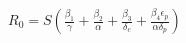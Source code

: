 \documentclass[preview]{standalone}
\begin{document}
\begin{center}
$R_0 = S (\frac{\beta_1}{\gamma} + \frac{\beta_2}{\alpha} + \frac{\beta_3}{\delta_c} + \frac{\beta_4 \epsilon_p}{\alpha \delta_p} )$
\end{center}
\end{document}
